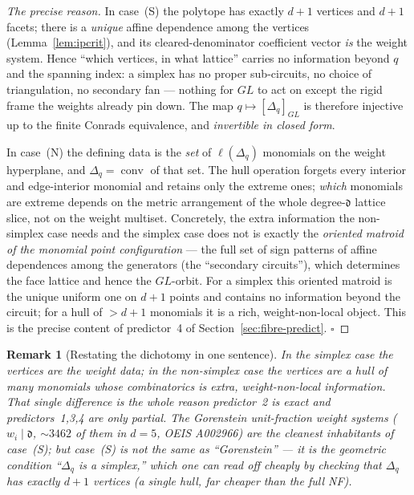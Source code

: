 \documentclass{amsart}
\newtheorem{remark}[theorem]{Remark}
\begin{document}
\begin{proof}[The precise reason]
In case~(S) the polytope has exactly $d{+}1$ vertices and $d{+}1$ facets; there
is a \emph{unique} affine dependence among the vertices
(Lemma~\ref{lem:ipcrit}), and its cleared-denominator coefficient vector
\emph{is} the weight system. Hence ``which vertices, in what lattice'' carries
no information beyond $q$ and the spanning index: a simplex has no proper
sub-circuits, no choice of triangulation, no secondary fan --- nothing for $GL$
to act on except the rigid frame the weights already pin down. The map
$q\mapsto[\Delta_q]_{GL}$ is therefore injective up to the finite Conrads
equivalence, and \emph{invertible in closed form}.

In case~(N) the defining data is the \emph{set} of $\ell(\Delta_q)$ monomials
on the weight hyperplane, and $\Delta_q=\operatorname{conv}$ of that set. The
hull operation forgets every interior and edge-interior monomial and retains
only the extreme ones; \emph{which} monomials are extreme depends on the metric
arrangement of the whole degree-$\mathfrak d$ lattice slice, not on the weight
multiset. Concretely, the extra information the non-simplex case needs and the
simplex case does not is exactly the \emph{oriented matroid of the monomial
point configuration} --- the full set of sign patterns of affine dependences
among the generators (the ``secondary circuits''), which determines the face
lattice and hence the $GL$-orbit. For a simplex this oriented matroid is the
unique uniform one on $d{+}1$ points and contains no information beyond the
circuit; for a hull of $>d{+}1$ monomials it is a rich, weight-non-local object.
This is the precise content of predictor~4 of
Section~\ref{sec:fibre-predict}. $\square$
\end{proof}

\begin{remark}[Restating the dichotomy in one sentence]\label{rmk:dichotomy}
\emph{In the simplex case the vertices are the weight data; in the non-simplex
case the vertices are a hull of many monomials whose combinatorics is extra,
weight-non-local information.} That single difference is the whole reason
predictor~2 is exact and predictors~1,3,4 are only partial. The Gorenstein
unit-fraction weight systems ($w_i\mid\mathfrak d$, $\sim$$3462$ of them in
$d=5$, OEIS A002966) are the cleanest inhabitants of case~(S); but case~(S) is
\emph{not} the same as ``Gorenstein'' --- it is the geometric condition
``$\Delta_q$ is a simplex,'' which one can read off cheaply by checking that
$\Delta_q$ has exactly $d{+}1$ vertices (a single hull, far cheaper than the
full NF).
\end{remark}
\end{document}
